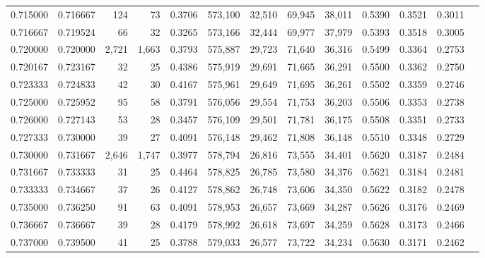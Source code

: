 \begin{tabular}{rrrrrrrrrrrrr}
0.715000 & 0.716667 &    124 &    73 &                                     0.3706 & 573,100 &  32,510 &  69,945 &  38,011 & 0.5390 & 0.3521 & 0.3011 \\
0.716667 & 0.719524 &     66 &    32 &                                     0.3265 & 573,166 &  32,444 &  69,977 &  37,979 & 0.5393 & 0.3518 & 0.3005 \\
0.720000 & 0.720000 &  2,721 & 1,663 &                                     0.3793 & 575,887 &  29,723 &  71,640 &  36,316 & 0.5499 & 0.3364 & 0.2753 \\
0.720167 & 0.723167 &     32 &    25 &                                     0.4386 & 575,919 &  29,691 &  71,665 &  36,291 & 0.5500 & 0.3362 & 0.2750 \\
0.723333 & 0.724833 &     42 &    30 &                                     0.4167 & 575,961 &  29,649 &  71,695 &  36,261 & 0.5502 & 0.3359 & 0.2746 \\
0.725000 & 0.725952 &     95 &    58 &                                     0.3791 & 576,056 &  29,554 &  71,753 &  36,203 & 0.5506 & 0.3353 & 0.2738 \\
0.726000 & 0.727143 &     53 &    28 &                                     0.3457 & 576,109 &  29,501 &  71,781 &  36,175 & 0.5508 & 0.3351 & 0.2733 \\
0.727333 & 0.730000 &     39 &    27 &                                     0.4091 & 576,148 &  29,462 &  71,808 &  36,148 & 0.5510 & 0.3348 & 0.2729 \\
0.730000 & 0.731667 &  2,646 & 1,747 &                                     0.3977 & 578,794 &  26,816 &  73,555 &  34,401 & 0.5620 & 0.3187 & 0.2484 \\
0.731667 & 0.733333 &     31 &    25 &                                     0.4464 & 578,825 &  26,785 &  73,580 &  34,376 & 0.5621 & 0.3184 & 0.2481 \\
0.733333 & 0.734667 &     37 &    26 &                                     0.4127 & 578,862 &  26,748 &  73,606 &  34,350 & 0.5622 & 0.3182 & 0.2478 \\
0.735000 & 0.736250 &     91 &    63 &                                     0.4091 & 578,953 &  26,657 &  73,669 &  34,287 & 0.5626 & 0.3176 & 0.2469 \\
0.736667 & 0.736667 &     39 &    28 &                                     0.4179 & 578,992 &  26,618 &  73,697 &  34,259 & 0.5628 & 0.3173 & 0.2466 \\
0.737000 & 0.739500 &     41 &    25 &                                     0.3788 & 579,033 &  26,577 &  73,722 &  34,234 & 0.5630 & 0.3171 & 0.2462 \\

\end{tabular}
